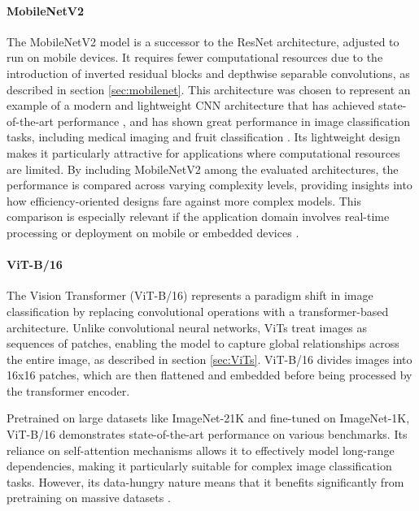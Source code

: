\paragraph{MobileNetV2}
The MobileNetV2 model  is a successor to the ResNet architecture, adjusted to run on mobile devices. It requires fewer computational resources due to the introduction of inverted residual blocks and depthwise separable convolutions, as described in section \ref{sec:mobilenet}. This architecture was chosen to represent an example of a modern and lightweight CNN architecture that has achieved state-of-the-art performance \cite{sandler2018mobilenetv2}, and has shown great performance in image classification tasks, including medical imaging \cite{surya2024enhancedbreastcancertumor} and fruit classification \cite{10112802, shahi2022fruit}. Its lightweight design makes it particularly attractive for applications where computational resources are limited. By including MobileNetV2 among the evaluated architectures, the performance is compared across varying complexity levels, providing insights into how efficiency-oriented designs fare against more complex models. This comparison is especially relevant if the application domain involves real-time processing or deployment on mobile or embedded devices \cite{sandler2018mobilenetv2}. 


\paragraph{ViT-B/16}
The Vision Transformer (ViT-B/16) \cite{dosovitskiy2021imageworth16x16words} represents a paradigm shift in image classification by replacing convolutional operations with a transformer-based architecture. Unlike convolutional neural networks, ViTs treat images as sequences of patches, enabling the model to capture global relationships across the entire image, as described in section \ref{sec:ViTs}. ViT-B/16 divides images into 16x16 patches, which are then flattened and embedded before being processed by the transformer encoder.

Pretrained on large datasets like ImageNet-21K and fine-tuned on ImageNet-1K, ViT-B/16 demonstrates state-of-the-art performance on various benchmarks. Its reliance on self-attention mechanisms allows it to effectively model long-range dependencies, making it particularly suitable for complex image classification tasks. However, its data-hungry nature means that it benefits significantly from pretraining on massive datasets \cite{dosovitskiy2021imageworth16x16words}.

